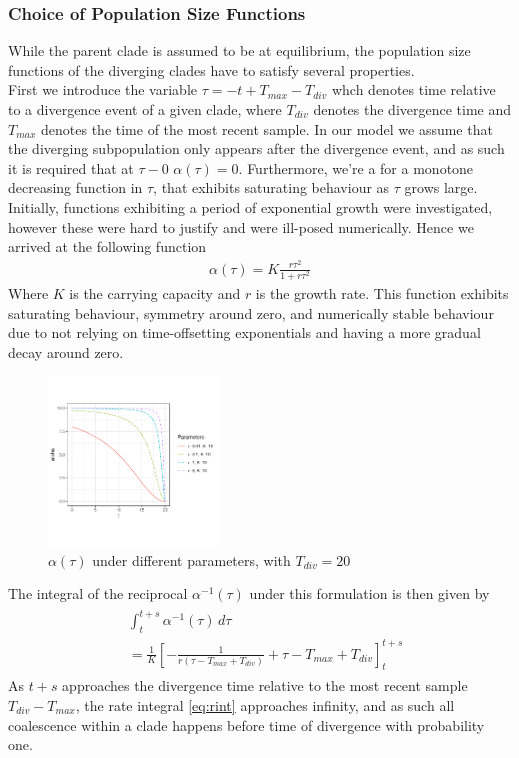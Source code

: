 \documentclass{ieeeaccess}
\theoremstyle{definition}
\begin{document}
\subsubsection{Choice of Population Size Functions} 
While the parent clade is assumed to be at equilibrium, the population size functions of the diverging clades have to satisfy several properties.\\
First we introduce the variable $\tau = -t + T_{max} - T_{div}$ whch denotes time relative to a divergence event of a given clade, where $T_{div}$ denotes the divergence time and $T_{max}$ denotes the time of the most recent sample.
In our model we assume that the diverging subpopulation only appears after the divergence event, and as such it is required that at $\tau-0$ $\alpha(\tau)=0$. Furthermore, we're a for a monotone decreasing function in $\tau$, that exhibits saturating behaviour as $\tau$ grows large.
Initially, functions exhibiting a period of exponential growth were investigated, however these were hard to justify and were ill-posed numerically.
Hence we arrived at the following function
\begin{gather}
\alpha(\tau) = K\frac{r\tau^2}{1+r\tau^2}
\end{gather} 
Where $K$ is the carrying capacity and $r$ is the growth rate.
This function  exhibits saturating behaviour, symmetry around zero, and numerically stable behaviour due to not relying on time-offsetting exponentials and having a more gradual decay around zero.\\
\begin{figure}[H]
  \centering
     \includegraphics[width=0.4\textwidth]{../R/alpha_plots}
    \caption{$\alpha(\tau)$ under different parameters, with $T_{div}=20$}
\end{figure}
The integral of the reciprocal $\alpha^{-1}(\tau)$ under this formulation is then given by 
\begin{gather}
\begin{aligned}\label{eq:rint}
&\int_{t}^{t+s}\alpha^{-1}(\tau)\,d\tau\\ &= \frac{1}{K}\left[-\frac{1}{r(\tau-T_{max}+T_{div})}+\tau-T_{max}+T_{div}\right]_{t}^{t+s}
\end{aligned}
\end{gather}
As $t+s$ approaches the divergence time relative to the most recent sample $T_{div} - T_{max}$, the rate integral \ref{eq:rint} approaches infinity, and as such all coalescence within a clade happens before time of divergence with probability one.
\end{document}
